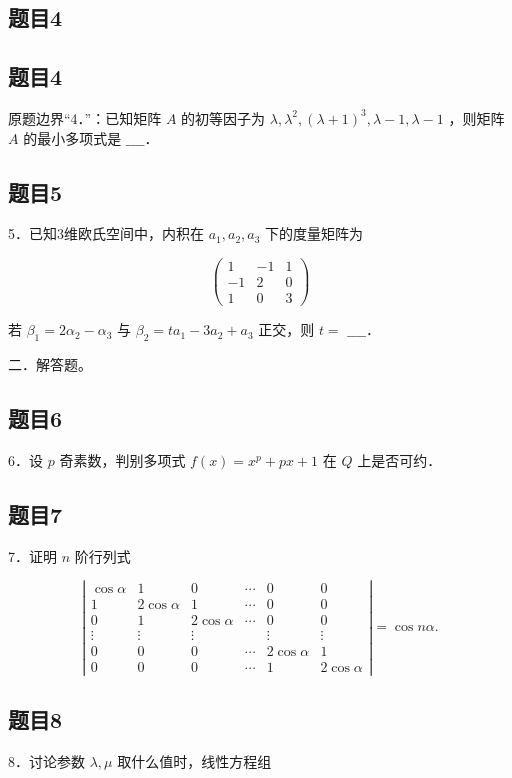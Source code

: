 \documentclass{article}
\begin{document}
\subsection{题目4}

\subsection{题目4}
原题边界“4．”：已知矩阵 \(A\) 的初等因子为 \(\lambda, \lambda^{2},(\lambda+1)^{3}, \lambda-1, \lambda-1\) ，则矩阵 \(A\) 的最小多项式是 \(\_\_\_\_\)．

\subsection{题目5}
5．已知3维欧氏空间中，内积在 \(a_{1}, a_{2}, a_{3}\) 下的度量矩阵为

\[
\left(\begin{array}{ccc}
1 & -1 & 1 \\
-1 & 2 & 0 \\
1 & 0 & 3
\end{array}\right)
\]

若 \(\beta_{1}=2 \alpha_{2}-\alpha_{3}\) 与 \(\beta_{2}=t a_{1}-3 a_{2}+a_{3}\) 正交，则 \(t=\) \(\_\_\_\_\)．

二．解答题。\\

\subsection{题目6}
6．设 \(p\) 奇素数，判别多项式 \(f(x)=x^{p}+p x+1\) 在 \(Q\) 上是否可约．

\subsection{题目7}
7．证明 \(n\) 阶行列式

\[
\left|\begin{array}{cccccc}
\cos \alpha & 1 & 0 & \cdots & 0 & 0 \\
1 & 2 \cos \alpha & 1 & \cdots & 0 & 0 \\
0 & 1 & 2 \cos \alpha & \cdots & 0 & 0 \\
\vdots & \vdots & \vdots & & \vdots & \vdots \\
0 & 0 & 0 & \cdots & 2 \cos \alpha & 1 \\
0 & 0 & 0 & \cdots & 1 & 2 \cos \alpha
\end{array}\right|=\cos n \alpha .
\]

\subsection{题目8}
8．讨论参数 \(\lambda, \mu\) 取什么值时，线性方程组
\end{document}
